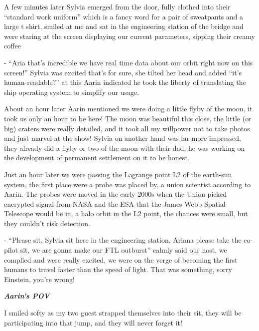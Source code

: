 \documentclass[colorlinks,12pt,a4paper]{book}
\begin{document}
A few minutes later Sylvia emerged from the door, fully clothed into their “standard work uniform” which is a fancy 
word for a pair of sweatpants and a large t shirt, smiled at me and sat in the engineering station of 
the bridge and were staring at the screen displaying our current parameters, sipping their creamy coffee\par
\bigskip

- “Aria that's incredible we have real time data about our orbit right now on this screen!” Sylvia was excited 
that's for sure, she tilted her head and added “it's human-readable?” at this Aarin indicated he took the liberty 
of translating the ship operating system to simplify our usage.\par
\bigskip

About an hour later Aarin mentioned we were doing a little flyby of the moon, it took us only an hour to be here! 
The moon was beautiful this close, the little (or big) craters were really detailed, and it took all my willpower 
not to take photos and just marvel at the show! Sylvia on another hand was far more impressed, they already did a 
flyby or two of the moon with their dad, he was working on the development of permanent settlement on it to be honest.\par
\bigskip

Just an hour later we were passing the Lagrange point L2 of the earth-sun system, the first place were a probe was 
placed by, a union scientist according to Aarin. The probes were moved in the early 2000s when the Union 
picked encrypted signal from NASA and the ESA that the James Webb Spatial Telescope would be in, a halo orbit in the 
L2 point, the chances were small, but they couldn't risk detection.\par
\bigskip

- “Please sit, Sylvia sit here in the engineering station, Ariana please take the co-pilot sit, we are gonna make 
our FTL outburst” calmly said our host, we complied and were really excited, we were on the verge of becoming 
the first humans to travel faster than the speed of light. That was something, sorry Einstein, you're wrong!\par
\bigskip


\textit{\textbf{Aarin's POV}}\par
\bigskip

I smiled softy as my two guest strapped themselves into their sit, they will be participating into 
that jump, and they will never forget it!\par
\bigskip
\end{document}
